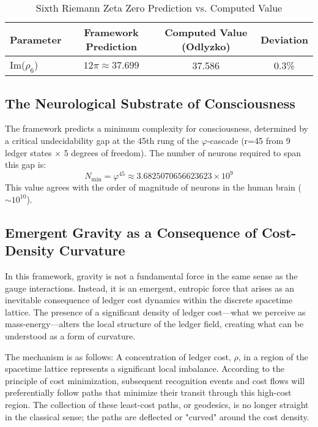 \documentclass[11pt,a4paper]{article}
\begin{document}
\begin{table}[h!]
\centering
\caption{Sixth Riemann Zeta Zero Prediction vs. Computed Value}
\label{tab:rh_zero}
\begin{tabular}{lccc}
\toprule
\textbf{Parameter} & \textbf{Framework Prediction} & \textbf{Computed Value (Odlyzko)} & \textbf{Deviation} \\
\midrule
Im(\(\rho_6\)) & \(12\pi \approx 37.699\) & 37.586 & 0.3\% \\
\bottomrule
\end{tabular}
\end{table}

\subsection{The Neurological Substrate of Consciousness}
The framework predicts a minimum complexity for consciousness, determined by a critical undecidability gap at the 45th rung of the \(\varphi\)-cascade (r=45 from 9 ledger states \(\times\) 5 degrees of freedom). The number of neurons required to span this gap is:
\begin{equation}
N_{\text{min}} = \varphi^{45} \approx 3.6825070656623623 \times 10^9
\end{equation}
This value agrees with the order of magnitude of neurons in the human brain (\(\sim 10^{10}\)).

\subsection{Emergent Gravity as a Consequence of Cost-Density Curvature}
In this framework, gravity is not a fundamental force in the same sense as the gauge interactions. Instead, it is an emergent, entropic force that arises as an inevitable consequence of ledger cost dynamics within the discrete spacetime lattice. The presence of a significant density of ledger cost—what we perceive as mass-energy—alters the local structure of the ledger field, creating what can be understood as a form of curvature.

The mechanism is as follows: A concentration of ledger cost, \(\rho\), in a region of the spacetime lattice represents a significant local imbalance. According to the principle of cost minimization, subsequent recognition events and cost flows will preferentially follow paths that minimize their transit through this high-cost region. The collection of these least-cost paths, or geodesics, is no longer straight in the classical sense; the paths are deflected or "curved" around the cost density.
\end{document}
